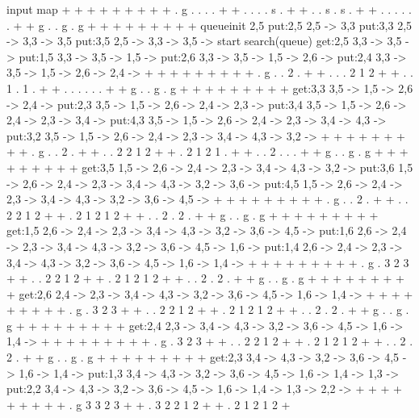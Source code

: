 input map
  +  +  +  +  +  +  +  +
  +  .  g  .  .  .  .  +
  +  .  .  .  .  s  .  +
  +  .  .  s  .  s  .  +
  +  .  .  .  .  .  .  +
  +  g  .  .  g  .  g  +
  +  +  +  +  +  +  +  +
queueinit
2,5
put:2,5   2,5 -> 
3,3
put:3,3   2,5 -> 3,3 -> 
3,5
put:3,5   2,5 -> 3,3 -> 3,5 -> 
start search(queue)
get:2,5   3,3 -> 3,5 -> 
put:1,5   3,3 -> 3,5 -> 1,5 -> 
put:2,6   3,3 -> 3,5 -> 1,5 -> 2,6 -> 
put:2,4   3,3 -> 3,5 -> 1,5 -> 2,6 -> 2,4 -> 
  +  +  +  +  +  +  +  +
  +  .  g  .  .  2  .  +
  +  .  .  .  2  1  2  +
  +  .  .  1  .  1  .  +
  +  .  .  .  .  .  .  +
  +  g  .  .  g  .  g  +
  +  +  +  +  +  +  +  +
get:3,3   3,5 -> 1,5 -> 2,6 -> 2,4 -> 
put:2,3   3,5 -> 1,5 -> 2,6 -> 2,4 -> 2,3 -> 
put:3,4   3,5 -> 1,5 -> 2,6 -> 2,4 -> 2,3 -> 3,4 -> 
put:4,3   3,5 -> 1,5 -> 2,6 -> 2,4 -> 2,3 -> 3,4 -> 4,3 -> 
put:3,2   3,5 -> 1,5 -> 2,6 -> 2,4 -> 2,3 -> 3,4 -> 4,3 -> 3,2 -> 
  +  +  +  +  +  +  +  +
  +  .  g  .  .  2  .  +
  +  .  .  2  2  1  2  +
  +  .  2  1  2  1  .  +
  +  .  .  2  .  .  .  +
  +  g  .  .  g  .  g  +
  +  +  +  +  +  +  +  +
get:3,5   1,5 -> 2,6 -> 2,4 -> 2,3 -> 3,4 -> 4,3 -> 3,2 -> 
put:3,6   1,5 -> 2,6 -> 2,4 -> 2,3 -> 3,4 -> 4,3 -> 3,2 -> 3,6 -> 
put:4,5   1,5 -> 2,6 -> 2,4 -> 2,3 -> 3,4 -> 4,3 -> 3,2 -> 3,6 -> 4,5 -> 
  +  +  +  +  +  +  +  +
  +  .  g  .  .  2  .  +
  +  .  .  2  2  1  2  +
  +  .  2  1  2  1  2  +
  +  .  .  2  .  2  .  +
  +  g  .  .  g  .  g  +
  +  +  +  +  +  +  +  +
get:1,5   2,6 -> 2,4 -> 2,3 -> 3,4 -> 4,3 -> 3,2 -> 3,6 -> 4,5 -> 
put:1,6   2,6 -> 2,4 -> 2,3 -> 3,4 -> 4,3 -> 3,2 -> 3,6 -> 4,5 -> 1,6 -> 
put:1,4   2,6 -> 2,4 -> 2,3 -> 3,4 -> 4,3 -> 3,2 -> 3,6 -> 4,5 -> 1,6 -> 1,4 -> 
  +  +  +  +  +  +  +  +
  +  .  g  .  3  2  3  +
  +  .  .  2  2  1  2  +
  +  .  2  1  2  1  2  +
  +  .  .  2  .  2  .  +
  +  g  .  .  g  .  g  +
  +  +  +  +  +  +  +  +
get:2,6   2,4 -> 2,3 -> 3,4 -> 4,3 -> 3,2 -> 3,6 -> 4,5 -> 1,6 -> 1,4 -> 
  +  +  +  +  +  +  +  +
  +  .  g  .  3  2  3  +
  +  .  .  2  2  1  2  +
  +  .  2  1  2  1  2  +
  +  .  .  2  .  2  .  +
  +  g  .  .  g  .  g  +
  +  +  +  +  +  +  +  +
get:2,4   2,3 -> 3,4 -> 4,3 -> 3,2 -> 3,6 -> 4,5 -> 1,6 -> 1,4 -> 
  +  +  +  +  +  +  +  +
  +  .  g  .  3  2  3  +
  +  .  .  2  2  1  2  +
  +  .  2  1  2  1  2  +
  +  .  .  2  .  2  .  +
  +  g  .  .  g  .  g  +
  +  +  +  +  +  +  +  +
get:2,3   3,4 -> 4,3 -> 3,2 -> 3,6 -> 4,5 -> 1,6 -> 1,4 -> 
put:1,3   3,4 -> 4,3 -> 3,2 -> 3,6 -> 4,5 -> 1,6 -> 1,4 -> 1,3 -> 
put:2,2   3,4 -> 4,3 -> 3,2 -> 3,6 -> 4,5 -> 1,6 -> 1,4 -> 1,3 -> 2,2 -> 
  +  +  +  +  +  +  +  +
  +  .  g  3  3  2  3  +
  +  .  3  2  2  1  2  +
  +  .  2  1  2  1  2  +
